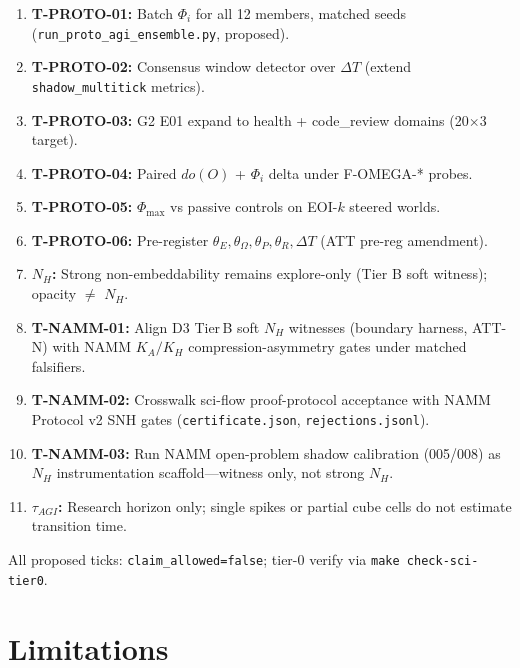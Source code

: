 \documentclass[11pt,a4paper]{article}
\theoremstyle{definition}
\begin{document}
\begin{enumerate}[leftmargin=*]
\item \textbf{T-PROTO-01:} Batch $\Phi_i$ for all 12 members, matched seeds (\texttt{run\_proto\_agi\_ensemble.py}, proposed).
\item \textbf{T-PROTO-02:} Consensus window detector over $\Delta T$ (extend \texttt{shadow\_multitick} metrics).
\item \textbf{T-PROTO-03:} G2 E01 expand to health + code\_review domains (20$\times$3 target).
\item \textbf{T-PROTO-04:} Paired $do(O)$ + $\Phi_i$ delta under F-OMEGA-* probes.
\item \textbf{T-PROTO-05:} $\Phi_{\max}$ vs passive controls on EOI-$k$ steered worlds.
\item \textbf{T-PROTO-06:} Pre-register $\theta_E,\theta_\Omega,\theta_P,\theta_R,\Delta T$ (ATT pre-reg amendment).
\item \textbf{$N_H$:} Strong non-embeddability remains explore-only (Tier B soft witness); opacity $\neq$ $N_H$.
\item \textbf{T-NAMM-01:} Align D3 Tier\,B soft $N_H$ witnesses (boundary harness, ATT-N) with NAMM $K_A/K_H$ compression-asymmetry gates under matched falsifiers.
\item \textbf{T-NAMM-02:} Crosswalk sci-flow proof-protocol acceptance with NAMM Protocol v2 SNH gates (\texttt{certificate.json}, \texttt{rejections.jsonl}).
\item \textbf{T-NAMM-03:} Run NAMM open-problem shadow calibration (005/008) as $N_H$ instrumentation scaffold---witness only, not strong $N_H$.
\item \textbf{$\tau_{AGI}$:} Research horizon only; single spikes or partial cube cells do not estimate transition time.
\end{enumerate}

All proposed ticks: \texttt{claim\_allowed=false}; tier-0 verify via \texttt{make check-sci-tier0}.

\section{Limitations}\label{sec:limitations}
\end{document}
